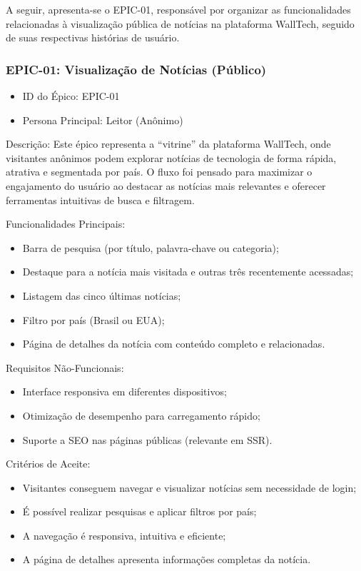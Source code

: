 A seguir, apresenta-se o EPIC-01, responsável por organizar as funcionalidades relacionadas à visualização pública de notícias na plataforma WallTech, seguido de suas respectivas histórias de usuário.

\subsubsection*{EPIC-01: Visualização de Notícias (Público)}

\begin{itemize}
  \item ID do Épico: EPIC-01
  \item Persona Principal: Leitor (Anônimo)
\end{itemize}

\noindent Descrição: Este épico representa a “vitrine” da plataforma WallTech, onde visitantes anônimos podem explorar notícias de tecnologia de forma rápida, atrativa e segmentada por país. O fluxo foi pensado para maximizar o engajamento do usuário ao destacar as notícias mais relevantes e oferecer ferramentas intuitivas de busca e filtragem.

\noindent Funcionalidades Principais:
\begin{itemize}
  \item Barra de pesquisa (por título, palavra-chave ou categoria);
  \item Destaque para a notícia mais visitada e outras três recentemente acessadas;
  \item Listagem das cinco últimas notícias;
  \item Filtro por país (Brasil ou EUA);
  \item Página de detalhes da notícia com conteúdo completo e relacionadas.
\end{itemize}

\noindent Requisitos Não-Funcionais:
\begin{itemize}
  \item Interface responsiva em diferentes dispositivos;
  \item Otimização de desempenho para carregamento rápido;
  \item Suporte a SEO nas páginas públicas (relevante em SSR).
\end{itemize}

\noindent Critérios de Aceite:
\begin{itemize}
  \item Visitantes conseguem navegar e visualizar notícias sem necessidade de login;
  \item É possível realizar pesquisas e aplicar filtros por país;
  \item A navegação é responsiva, intuitiva e eficiente;
  \item A página de detalhes apresenta informações completas da notícia.
\end{itemize}

